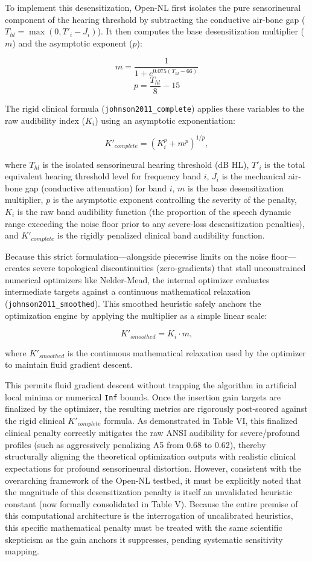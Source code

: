 \documentclass[
  12pt,
]{article}
\begin{document}
To implement this desensitization, Open-NL first isolates the pure
sensorineural component of the hearing threshold by subtracting the
conductive air-bone gap (\(T_{hl} = \max(0, T'_i - J_i)\)). It then
computes the base desensitization multiplier (\(m\)) and the asymptotic
exponent (\(p\)):

\[ m = \frac{1}{1 + e^{0.075(T_{hl} - 66)}} \]
\[ p = \frac{T_{hl}}{8} - 15 \]

The rigid clinical formula (\texttt{johnson2011\_complete}) applies
these variables to the raw audibility index (\(K_i\)) using an
asymptotic exponentiation:

\[ K'_{complete} = (K_i^p + m^p)^{1/p}, \]

where \(T_{hl}\) is the isolated sensorineural hearing threshold (dB
HL), \(T'_i\) is the total equivalent hearing threshold level for
frequency band \(i\), \(J_i\) is the mechanical air-bone gap (conductive
attenuation) for band \(i\), \(m\) is the base desensitization
multiplier, \(p\) is the asymptotic exponent controlling the severity of
the penalty, \(K_i\) is the raw band audibility function (the proportion
of the speech dynamic range exceeding the noise floor prior to any
severe-loss desensitization penalties), and \(K'_{complete}\) is the
rigidly penalized clinical band audibility function.

Because this strict formulation---alongside piecewise limits on the
noise floor---creates severe topological discontinuities
(zero-gradients) that stall unconstrained numerical optimizers like
Nelder-Mead, the internal optimizer evaluates intermediate targets
against a continuous mathematical relaxation
(\texttt{johnson2011\_smoothed}). This smoothed heuristic safely anchors
the optimization engine by applying the multiplier as a simple linear
scale:

\[ K'_{smoothed} = K_i \cdot m, \]

where \(K'_{smoothed}\) is the continuous mathematical relaxation used
by the optimizer to maintain fluid gradient descent.

This permits fluid gradient descent without trapping the algorithm in
artificial local minima or numerical \texttt{Inf} bounds. Once the
insertion gain targets are finalized by the optimizer, the resulting
metrics are rigorously post-scored against the rigid clinical
\(K'_{complete}\) formula. As demonstrated in Table VI, this finalized
clinical penalty correctly mitigates the raw ANSI audibility for
severe/profound profiles (such as aggressively penalizing A5 from 0.68
to 0.62), thereby structurally aligning the theoretical optimization
outputs with realistic clinical expectations for profound sensorineural
distortion. However, consistent with the overarching framework of the
Open-NL testbed, it must be explicitly noted that the magnitude of this
desensitization penalty is itself an unvalidated heuristic constant (now
formally consolidated in Table V). Because the entire premise of this
computational architecture is the interrogation of uncalibrated
heuristics, this specific mathematical penalty must be treated with the
same scientific skepticism as the gain anchors it suppresses, pending
systematic sensitivity mapping.
\end{document}
